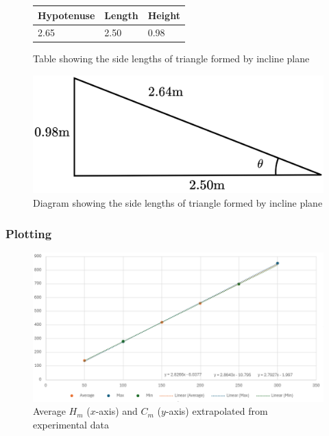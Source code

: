 \documentclass[11pt,a4paper]{article}
\begin{document}
\begin{figure}[H]
	\centering

	\begin{tabular}{|l|l|l|}
		\hline
		\textbf{Hypotenuse} & \textbf{Length} & \textbf{Height} \\ \hline
		2.65       & 2.50   & 0.98   \\ \hline
	\end{tabular}

	\caption{Table showing the side lengths of triangle formed by incline plane}
\end{figure}


\begin{figure}[H]
	\centering
	\includegraphics[width=0.35\paperwidth]{./Diagrams/LengthDiagram.png}
	\caption{Diagram showing the side lengths of triangle formed by incline plane}
\end{figure}


\subsubsection{Plotting}

\begin{figure}[H]
\centering
\includegraphics[width=0.8\paperwidth]{newresults.png}
\caption{Average $H_m$ ($x$-axis) and $C_m$ ($y$-axis) extrapolated from experimental data}
\end{figure}
\end{document}
